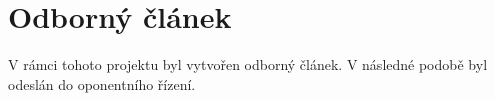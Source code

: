 \documentclass[oneside]{ctuthesis}
\theoremstyle{plain}
\theoremstyle{definition}
\theoremstyle{note}
\begin{document}
\appendix
\chapter{Odborný článek}
V rámci tohoto projektu byl vytvořen odborný článek. V následné podobě byl odeslán do oponentního řízení.














\end{document}
